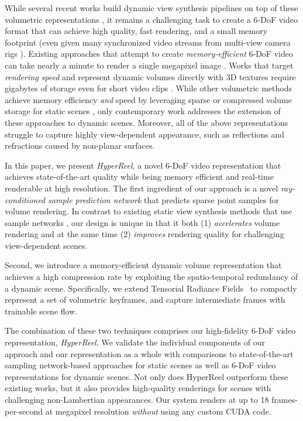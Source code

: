 \documentclass[10pt,twocolumn,letterpaper]{article}
\begin{document}
While several recent works build dynamic view synthesis pipelines on top of these volumetric representations \cite{XianHKK2021, LiNSW2021, GaoSKH2021, ParkSBBGSB2021, LiSZGLKSLGL2022}, it remains a challenging task to create a 6-DoF video format that can achieve high quality, fast rendering, and a small memory footprint (even given many synchronized video streams from multi-view camera rigs \cite{sabater2017dataset, ParraTFHMSSC2019, BroxtFOEHDDBWD2020}).
Existing approaches that attempt to create \textit{memory-efficient} 6-DoF video can take nearly a minute to render a single megapixel image \cite{LiSZGLKSLGL2022}.
Works that target \textit{rendering speed} and represent dynamic volumes directly with 3D textures require gigabytes of storage even for short video clips \cite{WangZLZZZWXY2022}.
While other volumetric methods achieve memory efficiency \textit{and} speed by leveraging sparse or compressed volume storage for static scenes \cite{MuelleESK2022, ChenXGYS2022}, only contemporary work \cite{LiSWST2022, SongCLCCYXG2023} addresses the extension of these approaches to dynamic scenes.
Moreover, all of the above representations struggle to capture highly view-dependent appearance, such as reflections and refractions caused by non-planar surfaces.





In this paper, we present \emph{HyperReel}, a novel 6-DoF video representation that achieves state-of-the-art quality while being memory efficient and real-time renderable at high resolution.
The first ingredient of our approach is a novel \emph{ray-conditioned sample prediction network} that predicts sparse point samples for volume rendering.
In contrast to existing static view synthesis methods that use sample networks \cite{NeffSPKCKS2021, KurzNLZS2022},
our design is unique in that it both 
(1) \emph{accelerates} volume rendering and at the same time 
(2) \emph{improves} rendering quality for challenging view-dependent scenes.

Second, we introduce a memory-efficient dynamic volume representation that achieves a high compression rate by exploiting the spatio-temporal redundancy of a dynamic scene.
Specifically, we extend Tensorial Radiance Fields~\cite{ChenXGYS2022} to compactly represent a set of volumetric keyframes, and capture intermediate frames with trainable scene flow. 

The combination of these two techniques comprises our high-fidelity 6-DoF video representation, \emph{HyperReel}.
We validate the individual components of our approach and our representation as a whole with comparisons to state-of-the-art sampling network-based approaches for static scenes as well as 6-DoF video representations for dynamic scenes.
Not only does HyperReel outperform these existing works, but it also provides high-quality renderings for scenes with challenging non-Lambertian appearances.
Our system renders at up to 18 frames-per-second at megapixel resolution \emph{without} using any custom CUDA code.
\end{document}
